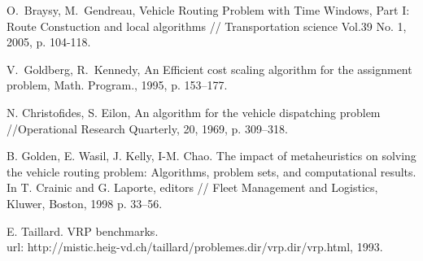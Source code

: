 \documentclass[]{TAACpaper}
\begin{document}
\begin{thebibliography}{99}
 O.~Braysy, M.~Gendreau, Vehicle Routing Problem with Time Windows, Part I: Route Constuction and local algorithms // Transportation science Vol.39 No. 1, 2005, p. 104-118.

 V.~Goldberg, R.~Kennedy, An Efficient cost scaling algorithm for the assignment problem, Math. Program., 1995, p. 153--177.  

  N. Christofides, S. Eilon, An algorithm for the vehicle dispatching problem //Operational Research Quarterly, 20, 1969, p. 309–318.

  B. Golden, E. Wasil, J. Kelly, I-M. Chao. The impact of metaheuristics on solving the vehicle routing problem: Algorithms, problem sets, and computational results. In T. Crainic and G. Laporte, editors // Fleet Management and Logistics, Kluwer, Boston, 1998 p. 33–56.

  E. Taillard. VRP benchmarks.\\ url: http://mistic.heig-vd.ch/taillard/problemes.dir/vrp.dir/vrp.html, 1993.




\end{thebibliography}
\end{document}
